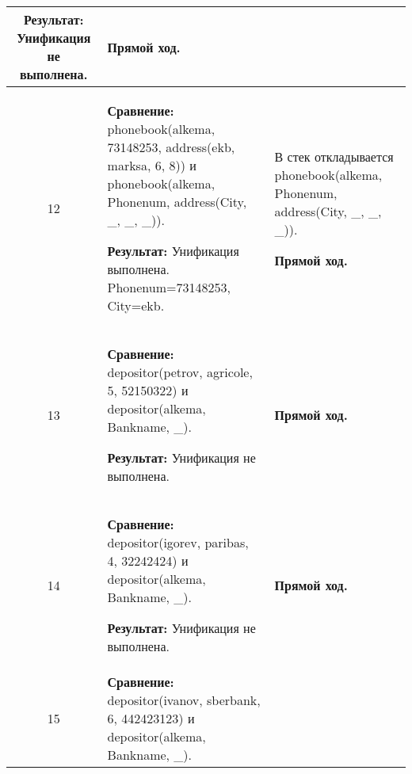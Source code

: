 \begin{longtable}{|c|p{}|p{}|}
    \textbf{Результат:} \newline
    Унификация не выполнена.
                       &
    \textbf{Прямой ход.}
                       \\ \hline

    12
                       &
\textbf{Сравнение:} \newline
  phonebook(alkema, 73148253,
            address(ekb,       marksa,       6,  8))
    \newline и \newline
    phonebook(alkema, Phonenum, address(City, \_, \_, \_)).
    \newline

    \textbf{Результат:} \newline
    Унификация выполнена.\newline{}
    Phonenum=73148253, City=ekb.
                       &
    В стек откладывается\newline
    phonebook(alkema, Phonenum, address(City, \_, \_, \_)).
    \newline

    \textbf{Прямой ход.}
                       \\ \hline

    13
                       &
\textbf{Сравнение:} \newline
  depositor(petrov, agricole, 5, 52150322)
    \newline и \newline
    depositor(alkema, Bankname, \_).
    \newline

    \textbf{Результат:} \newline
    Унификация не выполнена.
                       &
    \textbf{Прямой ход.}
                       \\ \hline

    14
                       &
\textbf{Сравнение:} \newline
  depositor(igorev, paribas,  4, 32242424)
    \newline и \newline
    depositor(alkema, Bankname, \_).
    \newline

    \textbf{Результат:} \newline
    Унификация не выполнена.
                       &
    \textbf{Прямой ход.}
                       \\ \hline

    15
                       &
\textbf{Сравнение:} \newline
  depositor(ivanov, sberbank, 6, 442423123)
    \newline и \newline
    depositor(alkema, Bankname, \_).
    \newline


\end{longtable}
